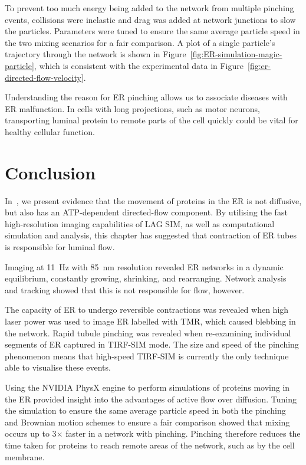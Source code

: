 To prevent too much energy being added to the network from multiple pinching events, collisions were inelastic and drag was added at network junctions to slow the particles. 
Parameters were tuned to ensure the same average particle speed in the two mixing scenarios for a fair comparison. 
A plot of a single particle's trajectory through the network is shown in Figure~\ref{fig:ER-simulation-magic-particle}, which is consistent with the experimental data in Figure~\ref{fig:er-directed-flow-velocity}. 

Understanding the reason for ER pinching allows us to associate diseases with ER malfunction. 
In cells with long projections, such as motor neurons, transporting luminal protein to remote parts of the cell quickly could be vital for healthy cellular function. 

\section{Conclusion} 
In~\cite{holcman2018single}, we present evidence that the movement of proteins in the ER is not diffusive, but also has an ATP-dependent directed-flow component.
By utilising the fast high-resolution imaging capabilities of LAG SIM, as well as computational simulation and analysis, this chapter has suggested that contraction of ER tubes is responsible for luminal flow. 

Imaging at \SI{11}{\hertz} with \SI{85}{\nano\metre} resolution revealed ER networks in a dynamic equilibrium, constantly growing, shrinking, and rearranging. 
Network analysis and tracking showed that this is not responsible for flow, however.

The capacity of ER to undergo reversible contractions was revealed when high laser power was used to image ER labelled with TMR, which caused blebbing in the network.
Rapid tubule pinching was revealed when re-examining individual segments of ER captured in TIRF-SIM mode. 
The size and speed of the pinching phenomenon means that high-speed TIRF-SIM is currently the only technique able to visualise these events. 

Using the NVIDIA PhysX engine to perform simulations of proteins moving in the ER provided insight into the advantages of active flow over diffusion.
Tuning the simulation to ensure the same average particle speed in both the pinching and Brownian motion schemes to ensure a fair comparison showed that mixing occurs up to 3$\times$ faster in a network with pinching.
Pinching therefore reduces the time taken for proteins to reach remote areas of the network, such as by the cell membrane. 

